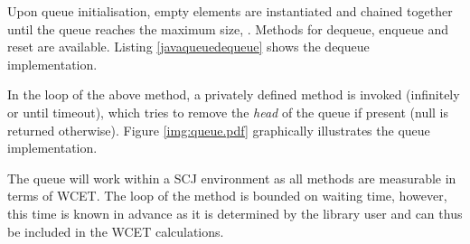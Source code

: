 

Upon queue initialisation, empty elements are instantiated and chained together until the queue reaches the maximum size, . Methods for dequeue, enqueue and reset are available. Listing \ref{javaqueuedequeue} shows the dequeue implementation.



In the loop of the above method, a privately defined  method is invoked (infinitely or until timeout), which tries to remove the \textit{head} of the queue if present (null is returned otherwise). Figure \ref{img:queue.pdf} graphically illustrates the queue implementation.


The queue will work within a SCJ environment as all methods are measurable in terms of WCET. The loop of the  method is bounded on waiting time, however, this time is known in advance as it is determined by the library user and can thus be included in the WCET calculations.